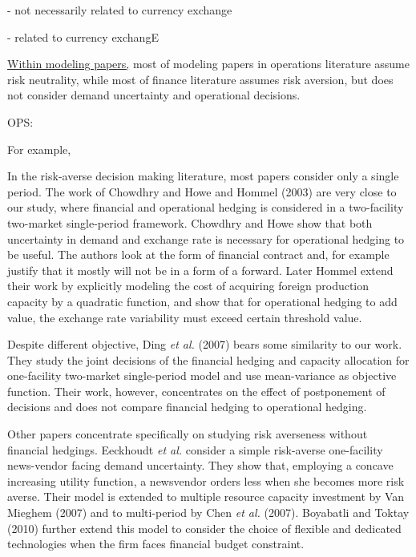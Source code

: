 \documentclass[mnsc,nonblindrev,copyedit]{informs2_wz} %
\begin{document}


	- not necessarily related to currency exchange



	- related to currency exchangE


\noindent \underline{Within modeling papers,} most of modeling papers in operations literature assume risk neutrality, while most of finance literature assumes risk aversion, but does not consider demand uncertainty and operational decisions.

OPS: 


For example, 


In the risk-averse decision making literature, most papers consider only a single period.  The work of Chowdhry and Howe \cite{Chowdhry1999} and Hommel (2003) are very close to our study, where financial and operational hedging is considered in a two-facility two-market single-period framework.  Chowdhry and Howe show that both uncertainty in demand and exchange rate is necessary for operational hedging to be useful.  The authors look at the form of financial contract and, for example justify that it mostly will not be in a form of a forward. Later Hommel extend their work by explicitly modeling the cost of acquiring foreign production capacity by a quadratic function, and show that for operational hedging to add value, the exchange rate variability must exceed certain threshold value.  

Despite different objective, Ding {\it et al.} (2007) bears some similarity to our work.  They study the joint decisions of the financial hedging and capacity allocation for one-facility two-market single-period model and use mean-variance as objective function.  Their work, however, {concentrates} on the effect of postponement of decisions and does not compare financial hedging to operational hedging. 


Other papers concentrate specifically on studying risk averseness without financial hedgings.  Eeckhoudt {\it et al.} \cite{Eeckhoudt1995} consider a simple risk-averse one-facility news-vendor facing demand uncertainty.  They show that, employing a concave increasing utility function, a newsvendor orders less when she becomes more risk averse. Their model is extended to multiple resource capacity investment by Van Mieghem (2007) and to multi-period by Chen {\it et al.} (2007). Boyabatli and Toktay (2010) further extend this model to consider the choice of flexible and dedicated technologies when the firm faces financial budget constraint.
\end{document}
